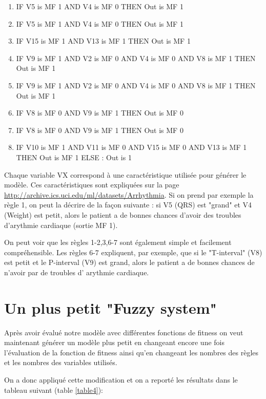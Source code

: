 \begin{enumerate}
  \item IF V5 is MF 1 AND V4 is MF 0 THEN Out is MF 1
  \item IF V5 is MF 1 AND V4 is MF 0 THEN Out is MF 1
  \item IF V15 is MF 1 AND V13 is MF 1 THEN Out is MF 1
  \item IF V9 is MF 1 AND V2 is MF 0 AND V4 is MF 0 AND V8 is MF 1 THEN Out is MF 1
  \item IF V9 is MF 1 AND V2 is MF 0 AND V4 is MF 0 AND V8 is MF 1 THEN Out is MF 1
  \item IF V8 is MF 0 AND V9 is MF 1 THEN Out is MF 0
  \item IF V8 is MF 0 AND V9 is MF 1 THEN Out is MF 0
  \item IF V10 is MF 1 AND V11 is MF 0 AND V15 is MF 0 AND V13 is MF 1 THEN Out is MF 1 ELSE : Out is 1  
\end{enumerate}

Chaque variable VX correspond à une caractéristique utilisée pour générer le modèle. Ces caractéristiques sont expliquées sur la page \url{http://archive.ics.uci.edu/ml/datasets/Arrhythmia}.
Si on prend par exemple la règle 1, on peut la décrire de la façon suivante : si V5 (QRS) est "grand" et V4 (Weight) est petit, alors le patient a de bonnes chances d'avoir des troubles d'arythmie cardiaque (sortie MF 1).

On peut voir que les règles 1-2,3,6-7 sont également simple et facilement compréhensible. 
Les règles 6-7 expliquent, par exemple, que si le "T-interval" (V8) est petit et le P-interval (V9) est grand, alors le patient a de bonnes chances de n'avoir par de troubles d' arythmie cardiaque.


\section*{Un plus petit "Fuzzy system"}

Après avoir évalué notre modèle avec différentes fonctions de fitness on veut maintenant générer un modèle plus petit en changeant encore une fois l'évaluation de la fonction de fitness ainsi qu'en changeant les nombres des règles et les nombres des variables utilisés.

On a donc appliqué cette modification et on a reporté les résultats dans le tableau suivant (table \ref{table4}):
 
